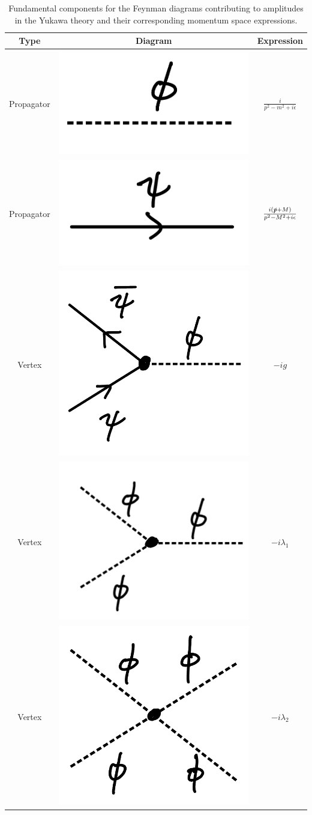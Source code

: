 {\begin{table}[h!tb]
\centering
    \begin{tabular}{|c|c|c|}
    \hline
    Type & Diagram & Expression \\
    \hline
    Propagator & \includegraphics[width=0.2\linewidth]{KG_prop.jpeg} & $\frac{i}{p^2 - m^2 + i \epsilon}$ \\
    \hline
    Propagator & \includegraphics[width=0.2\linewidth]{D_prop.jpeg} & $\frac{i( \slashed{p} + M )}{p^2 - M^2 + i \epsilon}$ \\
    \hline
    Vertex & \includegraphics[width=0.2\linewidth]{Y_int1.jpeg} & $- i g$ \\
    \hline
    Vertex & \includegraphics[width=0.2\linewidth]{Y_int2.jpeg} & $- i \lambda_1$ \\
    \hline
    Vertex & \includegraphics[width=0.2\linewidth]{Y_int3.jpeg} & $- i \lambda_2$ \\
    \hline
\end{tabular}
\caption{Fundamental components for the Feynman diagrams contributing to amplitudes in the Yukawa theory and their corresponding momentum space expressions.}
\label{tab:Feynman-rules-Y}
\end{table}


}
